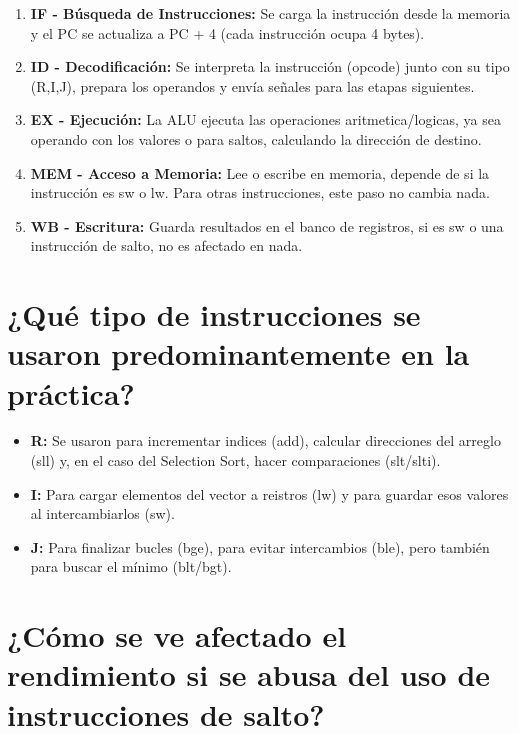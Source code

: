 \documentclass{article}
\begin{document}
\begin{enumerate}
    \item \textbf{IF - Búsqueda de Instrucciones: }Se carga la instrucción desde la memoria y el PC se actualiza a PC + 4 (cada instrucción ocupa 4 bytes).
    \item \textbf{ID - Decodificación: }Se interpreta la instrucción (opcode) junto con su tipo (R,I,J), prepara los operandos y envía señales para las etapas siguientes.

    \item \textbf{EX - Ejecución: }La ALU ejecuta las operaciones aritmetica/logicas, ya sea operando con los valores o para saltos, calculando la dirección de destino.

    \item \textbf{MEM - Acceso a Memoria: }Lee o escribe en memoria, depende de si la instrucción es sw o lw. Para otras instrucciones, este paso no cambia nada.

    \item \textbf{WB - Escritura: }Guarda resultados en el banco de registros, si es sw o una instrucción de salto, no es afectado en nada.
\end{enumerate}

\section*{¿Qué tipo de instrucciones se usaron predominantemente en la práctica?}

\begin{itemize}
    \item \textbf{R: }Se usaron para incrementar indices (add), calcular direcciones del arreglo (sll) y, en el caso del Selection Sort, hacer comparaciones (slt/slti).

    \item \textbf{I: }Para cargar elementos del vector a reistros (lw) y para guardar esos valores al intercambiarlos (sw).

    \item \textbf{J: }Para finalizar bucles (bge), para evitar intercambios (ble), pero también para buscar el mínimo (blt/bgt).    
\end{itemize}

\section*{¿Cómo se ve afectado el rendimiento si se abusa del uso de instrucciones de salto?}
\end{document}
